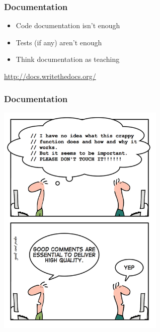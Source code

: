 \documentclass[14pt,notes]{beamer}
\begin{document}
\begin{frame}
\frametitle{Documentation}
\begin{itemize}
\item Code documentation isn't enough
\item Tests (if any) aren't enough
\item Think documentation as teaching
\end{itemize}
\url{http://docs.writethedocs.org/}
\end{frame}

\begin{frame}
\frametitle{Documentation}
\centering
\includegraphics[width=0.6\textwidth]{goodcomments}

\end{frame}
\end{document}
